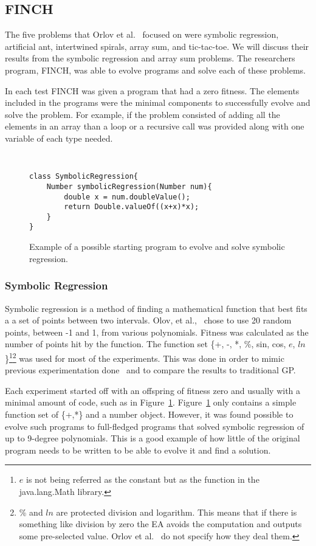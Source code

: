 \documentclass{sig-alternate}
\begin{document}
\subsection{FINCH}
The five problems that Orlov et al.~\cite{Assembly:2010} focused on were symbolic regression, artificial ant, intertwined spirals, array sum, and tic-tac-toe. We will discuss their results from the symbolic regression and array sum problems. The researchers program, FINCH, was able to evolve programs and solve each of these problems.

In each test FINCH was given a program that had a zero fitness. The elements included in the programs were the minimal components to successfully evolve and solve the problem. For example, if the problem consisted of adding all the elements in an array than a loop or a recursive call was provided along with one variable of each type needed.

\begin{figure}
\centering
{\tt
\begin{verbatim}
class SymbolicRegression{
    Number symbolicRegression(Number num){
        double x = num.doubleValue();
        return Double.valueOf((x+x)*x);
    }
}
\end{verbatim}
}
\caption{Example of a possible starting program to evolve and solve symbolic regression.}
\label{regression}
\end{figure}
\subsubsection{Symbolic Regression}
Symbolic regression is a method of finding a mathematical function that best fits a a set of points between two intervals. Olov, et al.,~\cite{FINCH:2011} chose to use 20 random points, between -1 and 1, from various polynomials. Fitness was calculated as the number of points hit by the function. The function set \{+, -, *, \%, sin, cos, $e$, $ln$\}\footnote{$e$ is not being referred as the constant but as the function in the java.lang.Math library.}\footnote{\% and $ln$ are protected division and logarithm. This means that if there is something like division by zero the EA avoids the computation and outputs some pre-selected value. Orlov et al.~\cite{FINCH:2011} do not specify how they deal them.} was used for most of the experiments. This was done in order to mimic previous experimentation done~\cite{koza:1992} and to compare the results to traditional GP.

Each experiment started off with an offspring of fitness zero and usually with a minimal amount of code, such as in Figure~\ref{regression}. Figure~\ref{regression} only contains a simple function set of \{+,*\} and a number object. However, it was found possible  to evolve such programs to full-fledged programs that solved symbolic regression of up to 9-degree polynomials. This is a good example of how little of the original program needs to be written to be able to evolve it and find a solution.
\end{document}
